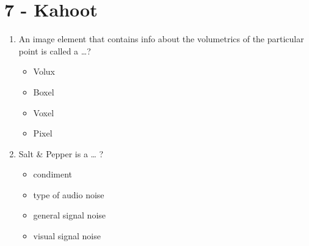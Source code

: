 \newpage

\section*{7 - Kahoot}

\begin{enumerate}
    \item An image element that contains info about the volumetrics of the particular point is called a …?
    \begin{itemize}
        \item Volux
        \item Boxel
        \item Voxel
        \item Pixel
    \end{itemize}
    \item Salt \& Pepper is a … ?
    \begin{itemize}
        \item condiment
        \item type of audio noise
        \item general signal noise
        \item visual signal noise
    \end{itemize}
\end{enumerate}
